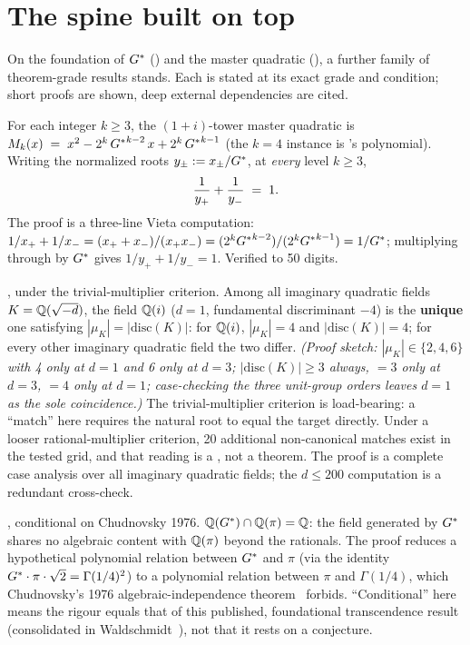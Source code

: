 \section{The spine built on top}\label{sec:spine}
On the foundation of $G^{*}$ () and the master quadratic
(), a further family of theorem-grade results stands. Each
is stated at its exact grade and condition; short proofs are shown, deep external
dependencies are cited.

 For each integer $k\ge3$, the
$(1+i)$-tower master quadratic is $M_k(x) \;=\; x^{2} - 2^{k}\,{G^{*}}^{k-2}\,x + 2^{k}\,{G^{*}}^{k-1}$ (the $k=4$ instance is
's polynomial). Writing the normalized roots
$y_\pm := x_\pm/G^{*}$, at \emph{every} level $k\ge3$,
\[ \frac{1}{y_+} + \frac{1}{y_-} \;=\; 1. \]
The proof is a three-line Vieta computation:
$1/x_+ + 1/x_- = (x_+ + x_-)/(x_+ x_-)
= (2^k{G^{*}}^{k-2})/(2^k{G^{*}}^{k-1}) = 1/G^{*}$; multiplying through by $G^{*}$ gives
$1/y_+ + 1/y_- = 1$. Verified to 50 digits.

, under the trivial-multiplier criterion.
Among all imaginary quadratic fields $K=\mathbb{Q}(\sqrt{-d})$, the field $\mathbb{Q}(i)$ ($d=1$,
fundamental discriminant $-4$) is the \textbf{unique} one satisfying
$|\mu_K|=|\mathrm{disc}(K)|$: for $\mathbb{Q}(i)$, $|\mu_K|=4$ and
$|\mathrm{disc}(K)|=4$; for every other imaginary quadratic field the two differ.
\emph{(Proof sketch: $|\mu_K|\in\{2,4,6\}$ with 4 only at $d=1$ and 6 only at
$d=3$; $|\mathrm{disc}(K)|\ge3$ always, $=3$ only at $d=3$, $=4$ only at $d=1$;
case-checking the three unit-group orders leaves $d=1$ as the sole coincidence.)}
The trivial-multiplier criterion is load-bearing: a ``match'' here requires the
natural root to equal the target directly. Under a looser rational-multiplier
criterion, 20 additional non-canonical matches exist in the tested grid, and that
reading is a , not a theorem. The proof is a complete case analysis over
all imaginary quadratic fields; the $d\le200$ computation is a redundant
cross-check.

, conditional on Chudnovsky
1976. $\mathbb{Q}(G^{*})\cap\mathbb{Q}(\pi)=\mathbb{Q}$: the field generated by $G^{*}$ shares
no algebraic content with $\mathbb{Q}(\pi)$ beyond the rationals. The proof reduces a
hypothetical polynomial relation between $G^{*}$ and $\pi$ (via the identity
$G^{*}\cdot\pi\cdot\sqrt2=\Gamma(1/4)^2$) to a polynomial relation between
$\pi$ and $\Gamma(1/4)$, which Chudnovsky's 1976 algebraic-independence
theorem~\cite{chudnovsky1984} forbids. ``Conditional'' here means the rigour
equals that of this published, foundational transcendence result (consolidated in
Waldschmidt~\cite{waldschmidt2000}), not that it rests on a conjecture.

